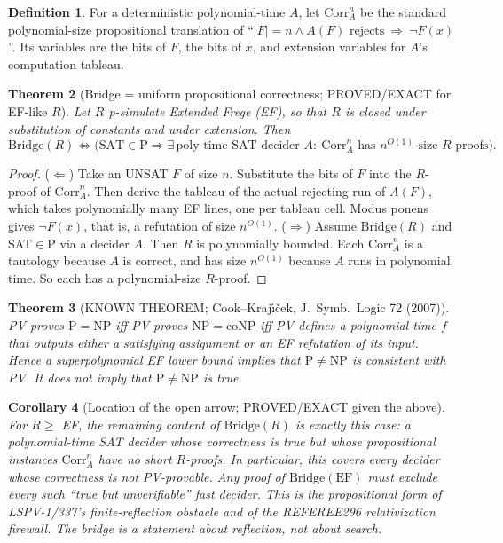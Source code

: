 \documentclass[11pt]{article}
\newtheorem{theorem}{Theorem}\newtheorem{lemma}[theorem]{Lemma}\newtheorem{corollary}[theorem]{Corollary}
\theoremstyle{definition}\newtheorem{definition}[theorem]{Definition}\newtheorem{remark}[theorem]{Remark}
\begin{document}
\begin{definition}
For a deterministic polynomial-time $A$, let $\mathrm{Corr}_A^{n}$ be the standard polynomial-size propositional translation of
``$|F|=n\wedge A(F)\text{ rejects}\ \Rightarrow\ \lnot F(x)$''. Its variables are the bits of $F$, the bits of $x$, and extension variables for $A$'s computation tableau.
\end{definition}

\begin{theorem}[Bridge = uniform propositional correctness; PROVED/EXACT for EF-like $R$]\label{thm:corr}
Let $R$ p-simulate Extended Frege (EF), so that $R$ is closed under substitution of constants and under extension. Then
\[
\mathrm{Bridge}(R)\iff\Big(\mathrm{SAT}\in\mathrm P\Rightarrow\exists\,\text{poly-time SAT decider }A:\ \mathrm{Corr}_A^{n}\text{ has } n^{O(1)}\text{-size }R\text{-proofs}\Big).
\]
\end{theorem}
\begin{proof}
($\Leftarrow$) Take an UNSAT $F$ of size $n$. Substitute the bits of $F$ into the $R$-proof of $\mathrm{Corr}_A^n$. Then derive the tableau of the actual rejecting run of $A(F)$, which takes polynomially many EF lines, one per tableau cell. Modus ponens gives $\lnot F(x)$, that is, a refutation of size $n^{O(1)}$.
($\Rightarrow$) Assume $\mathrm{Bridge}(R)$ and SAT$\in$P via a decider $A$. Then $R$ is polynomially bounded. Each $\mathrm{Corr}_A^n$ is a tautology because $A$ is correct, and has size $n^{O(1)}$ because $A$ runs in polynomial time. So each has a polynomial-size $R$-proof.
\end{proof}

\begin{theorem}[KNOWN THEOREM; Cook--Kraj\'{\i}\v{c}ek, J.\ Symb.\ Logic 72 (2007)]
PV proves $\mathrm P=\mathrm{NP}$ iff PV proves $\mathrm{NP}=\mathrm{coNP}$ iff PV defines a polynomial-time $f$ that outputs either a satisfying assignment or an EF refutation of its input. Hence a superpolynomial EF lower bound implies that $\mathrm P\ne\mathrm{NP}$ is \emph{consistent with PV}. It does not imply that $\mathrm P\ne\mathrm{NP}$ is true.
\end{theorem}

\begin{corollary}[Location of the open arrow; PROVED/EXACT given the above]
For $R\ge$ EF, the remaining content of $\mathrm{Bridge}(R)$ is exactly this case: a polynomial-time SAT decider whose correctness is \emph{true} but whose propositional instances $\mathrm{Corr}_A^n$ have no short $R$-proofs. In particular, this covers every decider whose correctness is not PV-provable. Any proof of $\mathrm{Bridge}(\mathrm{EF})$ must exclude every such ``true but unverifiable'' fast decider. This is the propositional form of LSPV-1/337's finite-reflection obstacle and of the REFEREE296 relativization firewall. The bridge is a statement about reflection, not about search.
\end{corollary}
\end{document}
